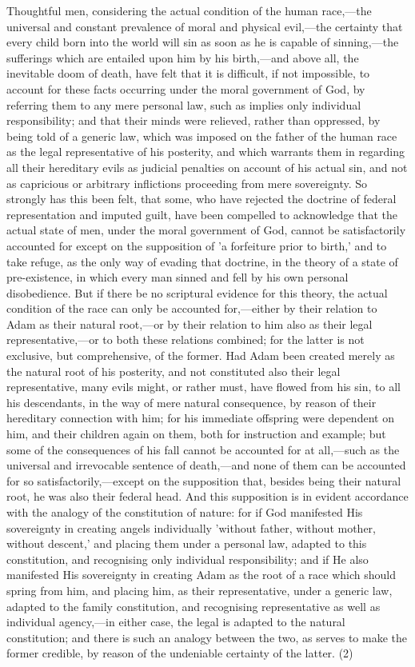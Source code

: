 \documentclass[
]{book}
\begin{document}
Thoughtful men, considering the actual condition of the human race,---the universal and constant prevalence of moral and physical evil,---the certainty that every child born into the world will sin as soon as he is capable of sinning,---the sufferings which are entailed upon him by his birth,---and above all, the inevitable doom of death, have felt that it is difficult, if not impossible, to account for these facts occurring under the moral government of God, by referring them to any mere personal law, such as implies only individual responsibility; and that their minds were relieved, rather than oppressed, by being told of a generic law, which was imposed on the father of the human race as the legal representative of his posterity, and which warrants them in regarding all their hereditary evils as judicial penalties on account of his actual sin, and not as capricious or arbitrary inflictions proceeding from mere sovereignty. So strongly has this been felt, that some, who have rejected the doctrine of federal representation and imputed guilt, have been compelled to acknowledge that the actual state of men, under the moral government of God, cannot be satisfactorily accounted for except on the supposition of 'a forfeiture prior to birth,' and to take refuge, as the only way of evading that doctrine, in the theory of a state of pre-existence, in which every man sinned and fell by his own personal disobedience. But if there be no scriptural evidence for this theory, the actual condition of the race can only be accounted for,---either by their relation to Adam as their natural root,---or by their relation to him also as their legal representative,---or to both these relations combined; for the latter is not exclusive, but comprehensive, of the former. Had Adam been created merely as the natural root of his posterity, and not constituted also their legal representative, many evils might, or rather must, have flowed from his sin, to all his descendants, in the way of mere natural consequence, by reason of their hereditary connection with him; for his immediate offspring were dependent on him, and their children again on them, both for instruction and example; but some of the consequences of his fall cannot be accounted for at all,---such as the universal and irrevocable sentence of death,---and none of them can be accounted for so satisfactorily,---except on the supposition that, besides being their natural root, he was also their federal head. And this supposition is in evident accordance with the analogy of the constitution of nature: for if God manifested His sovereignty in creating angels individually 'without father, without mother, without descent,' and placing them under a personal law, adapted to this constitution, and recognising only individual responsibility; and if He also manifested His sovereignty in creating Adam as the root of a race which should spring from him, and placing him, as their representative, under a generic law, adapted to the family constitution, and recognising representative as well as individual agency,---in either case, the legal is adapted to the natural constitution; and there is such an analogy between the two, as serves to make the former credible, by reason of the undeniable certainty of the latter. (2)
\end{document}
